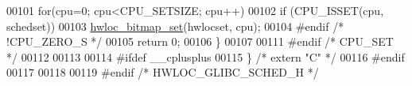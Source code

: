 \begin{DoxyCode}
00101   \textcolor{keywordflow}{for}(cpu=0; cpu<CPU\_SETSIZE; cpu++)
00102     \textcolor{keywordflow}{if} (CPU\_ISSET(cpu, schedset))
00103       \hyperlink{a00065_ga497556af0cc34f109ae0277999c074d3}{hwloc_bitmap_set}(hwlocset, cpu);
00104 \textcolor{preprocessor}{#endif }\textcolor{comment}{/* !CPU\_ZERO\_S */}
00105   \textcolor{keywordflow}{return} 0;
00106 \}
00107 
00111 \textcolor{preprocessor}{#endif }\textcolor{comment}{/* CPU\_SET */}
00112 
00113 
00114 \textcolor{preprocessor}{#ifdef \_\_cplusplus}
00115 \textcolor{preprocessor}{}\} \textcolor{comment}{/* extern "C" */}
00116 \textcolor{preprocessor}{#endif}
00117 \textcolor{preprocessor}{}
00118 
00119 \textcolor{preprocessor}{#endif }\textcolor{comment}{/* HWLOC\_GLIBC\_SCHED\_H */}
\end{DoxyCode}
